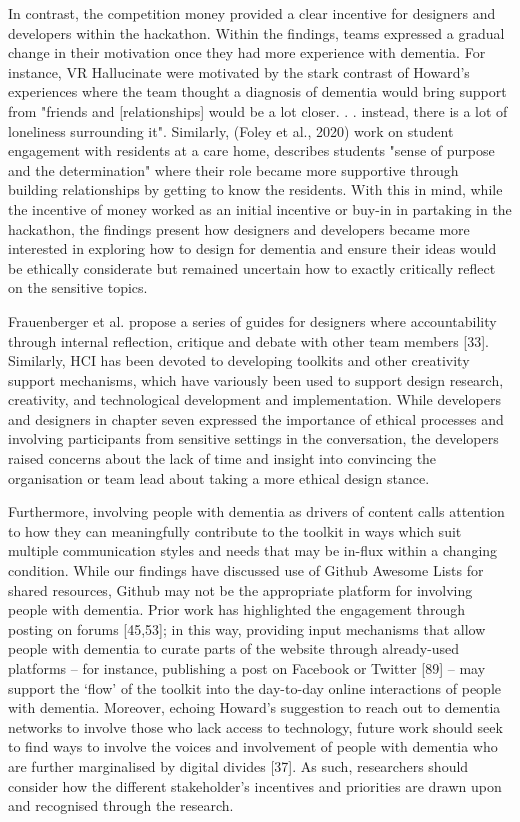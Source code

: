 In contrast, the competition money provided a clear incentive for designers and developers within the hackathon. Within the findings, teams expressed a gradual change in their motivation once they had more experience with dementia. For instance, VR Hallucinate were motivated by the stark contrast of Howard’s experiences where the team thought a diagnosis of dementia would bring support from "friends and [relationships] would be a lot closer. . . instead, there is a lot of loneliness surrounding it". Similarly, (Foley et al., 2020) work on student engagement with residents at a care home, describes students "sense of purpose and the determination" where their role became more supportive through building relationships by getting to know the residents. With this in mind, while the incentive of money worked as an initial incentive or buy-in in partaking in the hackathon, the findings present how designers and developers became more interested in exploring how to design for dementia and ensure their ideas would be ethically considerate but remained uncertain how to exactly critically reflect on the sensitive topics.

Frauenberger et al. propose a series of guides for designers where accountability through internal reflection, critique and debate with other team members [33]. Similarly, HCI has been devoted to developing toolkits and other creativity support mechanisms, which have variously been used to support design research, creativity, and technological development and implementation. While developers and designers in chapter seven expressed the importance of ethical processes and involving participants from sensitive settings in the conversation, the developers raised concerns about the lack of time and insight into convincing the organisation or team lead about taking a more ethical design stance.

Furthermore, involving people with dementia as drivers of content calls attention to how they can meaningfully contribute to the toolkit in ways which suit multiple communication styles and needs that may be in-flux within a changing condition. While our findings have discussed use of Github Awesome Lists for shared resources, Github may not be the appropriate platform for involving people with dementia. Prior work has highlighted the engagement through posting on forums [45,53]; in this way, providing input mechanisms that allow people with dementia to curate parts of the website through already-used platforms – for instance, publishing a post on Facebook or Twitter [89] – may support the ‘flow’ of the toolkit into the day-to-day online interactions of people with dementia. Moreover, echoing Howard’s suggestion to reach out to dementia networks to involve those who lack access to technology, future work should seek to find ways to involve the voices and involvement of people with dementia who are further marginalised by digital divides [37]. As such, researchers should consider how the different stakeholder's incentives and priorities are drawn upon and recognised through the research.



